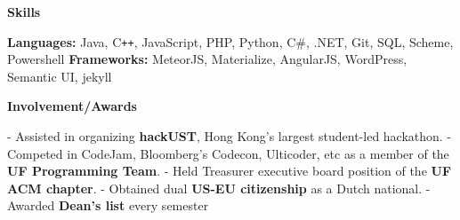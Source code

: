 \documentclass[letterpaper,10pt]{article}
\makeatletter
\newcommand{\resitem}[1]{\item #1 \vspace{-2pt}}
\newcommand{\resheading}[1]{{\large \colorbox{mygrey}{\begin{minipage}{\textwidth}{\textbf{#1 \vphantom{p\^{E}}}}\end{minipage}}}}
\newcommand{\ressubheading}[4]{
\begin{tabular*}{7.0in}{l@{\extracolsep{\fill}}r}
		\textbf{#1} & #2 \\
		\textit{#3} & \textit{#4} \\
\end{tabular*}\vspace{-6pt}}
\makeatother
\begin{document}
\resheading{Skills}

\begin{description}
\textbf{Languages:} \tabto{2.5cm} Java, C{}\verb!++!, JavaScript, PHP, Python, C\#, .NET, Git, SQL, Scheme, Powershell\newline
\textbf{Frameworks:} \tabto{2.5cm} MeteorJS, Materialize, AngularJS, WordPress, Semantic UI, jekyll
\end{description}

\resheading{Involvement/Awards}

\begin{description}
- Assisted in organizing \textbf{hackUST}, Hong Kong's largest student-led hackathon. \newline
- Competed in CodeJam, Bloomberg's Codecon, Ulticoder, etc as a member of the \textbf{UF Programming Team}. \newline
- Held Treasurer executive board position of the \textbf{UF ACM chapter}.\newline
- Obtained dual \textbf{US-EU citizenship} as a Dutch national.\newline
- Awarded \textbf{Dean's list} every semester
\end{description}
\end{document}
